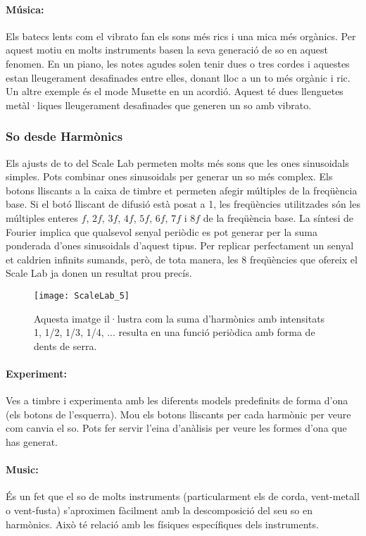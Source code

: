 \paragraph{Música:}Els batecs lents com el vibrato fan els sons més rics i una mica més orgànics. Per aquest motiu en molts instruments basen la seva generació de so en aquest fenomen. En un piano, les notes agudes solen tenir dues o tres cordes i aquestes estan lleugerament desafinades entre elles, donant lloc a un to més orgànic i ric. Un altre exemple és el mode Musette en un acordió. Aquest té dues llenguetes metàl·liques lleugerament desafinades que generen un so amb vibrato. 

\subsubsection{So desde Harmònics}
Els ajusts de to del Scale Lab permeten molts més sons que les ones sinusoidals simples. Pots combinar ones sinusoidals per generar un so més complex. Els botons lliscants a la caixa de timbre et permeten afegir múltiples de la freqüència base. Si el botó lliscant de difusió està posat a 1, les freqüències utilitzades són les múltiples enteres $f$, $2f$, $3f$, $4f$, $5f$, $6f$, $7f$ i $8f$ de la freqüència base. La síntesi de Fourier implica que qualsevol senyal periòdic es pot generar per la suma ponderada d'ones sinusoidals d'aquest tipus. Per replicar perfectament un senyal et caldrien infinits sumands, però, de tota manera, les 8 freqüències que ofereix el Scale Lab ja donen un resultat prou precís. 

\begin{figure}
\centering
\texttt{[image: ScaleLab\_5]}
\caption*{Aquesta imatge il·lustra com la suma d'harmònics amb intensitats 1, 1/2, 1/3, 1/4, ... resulta en una funció periòdica amb forma de dents de serra.}
\end{figure}

\paragraph{Experiment:}
Ves a timbre i experimenta amb les diferents models predefinits de forma d'ona (els botons de l'esquerra). Mou els botons lliscants per cada harmònic per veure com canvia el so. Pots fer servir l'eina d'anàlisis per veure les formes d'ona que has generat. 

\paragraph{Music:}
És un fet que el so de molts instruments (particularment els de corda, vent-metall o vent-fusta) s'aproximen fàcilment amb la descomposició del seu so en harmònics. Això té relació amb les físiques específiques dels instruments.

